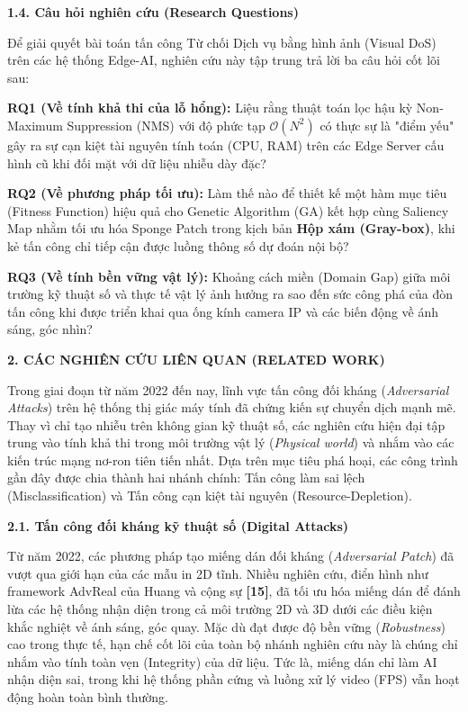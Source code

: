 \textbf{1.4. Câu hỏi nghiên cứu (Research Questions)}

Để giải quyết bài toán tấn công Từ chối Dịch vụ bằng hình ảnh (Visual
DoS) trên các hệ thống Edge-AI, nghiên cứu này tập trung trả lời ba câu
hỏi cốt lõi sau:

\textbf{RQ1 (Về tính khả thi của lỗ hổng):} Liệu rằng thuật toán lọc hậu
kỳ Non-Maximum Suppression (NMS) với độ phức tạp
\(\mathcal{O}\left( N^{2} \right)\) có thực sự là "điểm yếu" gây ra sự
cạn kiệt tài nguyên tính toán (CPU, RAM) trên các Edge Server cấu hình
cũ khi đối mặt với dữ liệu nhiễu dày đặc?

\textbf{RQ2 (Về phương pháp tối ưu):} Làm thế nào để thiết kế một hàm
mục tiêu (Fitness Function) hiệu quả cho Genetic Algorithm (GA) kết hợp
cùng Saliency Map nhằm tối ưu hóa Sponge Patch trong kịch bản
\textbf{Hộp xám (Gray-box)}, khi kẻ tấn công chỉ tiếp cận được luồng
thông số dự đoán nội bộ?

\textbf{RQ3 (Về tính bền vững vật lý):} Khoảng cách miền (Domain Gap)
giữa môi trường kỹ thuật số và thực tế vật lý ảnh hưởng ra sao đến sức
công phá của đòn tấn công khi được triển khai qua ống kính camera IP và
các biến động về ánh sáng, góc nhìn?

\textbf{2. CÁC NGHIÊN CỨU LIÊN QUAN (RELATED WORK)}

Trong giai đoạn từ năm 2022 đến nay, lĩnh vực tấn công đối kháng
(\emph{Adversarial Attacks}) trên hệ thống thị giác máy tính đã chứng
kiến sự chuyển dịch mạnh mẽ. Thay vì chỉ tạo nhiễu trên không gian kỹ
thuật số, các nghiên cứu hiện đại tập trung vào tính khả thi trong môi
trường vật lý (\emph{Physical world}) và nhắm vào các kiến trúc mạng
nơ-ron tiên tiến nhất. Dựa trên mục tiêu phá hoại, các công trình gần
đây được chia thành hai nhánh chính: Tấn công làm sai lệch
(Misclassification) và Tấn công cạn kiệt tài nguyên
(Resource-Depletion).

\textbf{2.1. Tấn công đối kháng kỹ thuật số (Digital Attacks)}

Từ năm 2022, các phương pháp tạo miếng dán đối kháng (\emph{Adversarial
Patch}) đã vượt qua giới hạn của các mẫu in 2D tĩnh. Nhiều nghiên cứu,
điển hình như framework AdvReal của Huang và cộng sự \textbf{{[}15{]}},
đã tối ưu hóa miếng dán để đánh lừa các hệ thống nhận diện trong cả môi
trường 2D và 3D dưới các điều kiện khắc nghiệt về ánh sáng, góc quay.
Mặc dù đạt được độ bền vững (\emph{Robustness}) cao trong thực tế, hạn
chế cốt lõi của toàn bộ nhánh nghiên cứu này là chúng chỉ nhắm vào tính
toàn vẹn (Integrity) của dữ liệu. Tức là, miếng dán chỉ làm AI nhận diện
sai, trong khi hệ thống phần cứng và luồng xử lý video (FPS) vẫn hoạt
động hoàn toàn bình thường.

